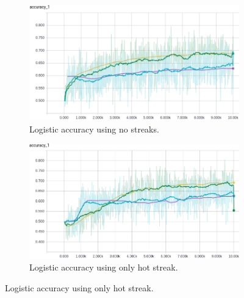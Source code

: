 \documentclass{article} %
\begin{document}
\begin{figure}[!htb]
  \begin{subfigure}{0.5\textwidth}
    \includegraphics[width=\linewidth]{plots/linear-model/streak-/accuracy.png}
    \caption{Logistic accuracy using no streaks.}\label{fig:linear--accuracy}
  \end{subfigure}
  \begin{subfigure}{0.5\textwidth}
    \includegraphics[width=\linewidth]{plots/linear-model/streak-h/accuracy.png}
    \caption{Logistic accuracy using only hot streak.}\label{fig:linear-h-accuracy}
  \end{subfigure}



\end{figure}
\end{document}
